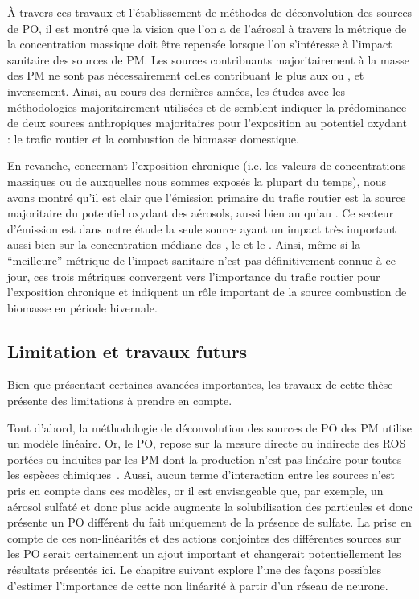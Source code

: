 À travers ces travaux et l'établissement de méthodes de déconvolution des sources de PO, il
est montré que la vision que l'on a de l'aérosol à travers la métrique de la
concentration massique doit être repensée lorsque l'on s'intéresse à l'impact sanitaire
des sources de PM. Les sources contribuants majoritairement à la masse des PM ne sont pas
nécessairement celles contribuant le plus aux \POAA{} ou \PODTT, et inversement.
Ainsi, au cours des dernières années, les études avec les méthodologies majoritairement utilisées \POAA{} et \PODTT{} de
\cite{vermaReactive2014,batesReactive2015,fangOxidative2016,weberApportionment2018,cesariSource2019,daellenbachSourcessubmitted,weberSourceinprep.}
semblent indiquer la prédominance de deux sources anthropiques majoritaires pour l'exposition
au potentiel oxydant : le trafic routier et la combustion de biomasse domestique.

En revanche, concernant l'exposition chronique (i.e. les valeurs de concentrations
massiques ou de \POv{} auxquelles nous sommes exposés la plupart du temps),
nous avons montré qu'il est clair que
l'émission primaire du trafic routier est la source majoritaire du potentiel oxydant des
aérosols, aussi bien au \POAA{} qu'au \PODTT. Ce secteur d'émission est dans notre étude
la seule source ayant un impact très important aussi bien sur la concentration médiane des
\PMdix{}, le \POAAv{} et le \PODTTv.
Ainsi, même si la ``meilleure'' métrique de l'impact sanitaire n'est pas définitivement
connue à ce jour, ces trois métriques convergent vers l'importance du trafic routier pour
l'exposition chronique et indiquent un rôle important de la source combustion de biomasse
en période hivernale.

\subsection{Limitation et travaux futurs}%
\label{sub:limitation_et_travaux_futur}

Bien que présentant certaines avancées importantes, les travaux de cette thèse présente
des limitations à prendre en compte.

Tout d'abord, la méthodologie de déconvolution des sources de PO des PM utilise un modèle
linéaire. Or, le PO, repose sur la mesure directe ou indirecte des ROS portées ou induites
par les PM dont la production n'est pas linéaire pour toutes les espèces
chimiques~\autocite{charrierDithiothreitol2012,sauvainComparison2013,charrierRates2015,charrierBias2016,calasImportance2017}.
Aussi, aucun terme d'interaction entre les sources n'est pris en compte dans ces modèles,
or il est envisageable que, par exemple, un aérosol sulfaté et donc plus acide augmente la
solubilisation des particules et donc présente un PO différent du fait
uniquement de la présence de sulfate.  La prise en compte de ces non-linéarités et des
actions conjointes des différentes sources sur les PO serait certainement un ajout
important et changerait potentiellement les résultats présentés ici. Le chapitre suivant
explore l'une des façons possibles d'estimer l'importance de cette non linéarité à partir
d'un réseau de neurone.

